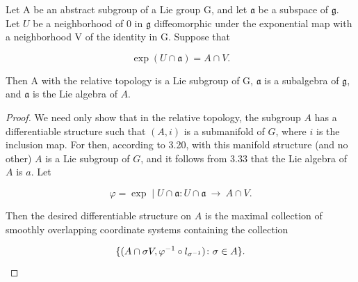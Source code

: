 \begin{theorem}\label{thm:3.34}
Let A be an abstract subgroup of a Lie group G, and let $\mathfrak{a}$ be a subspace of $\mathfrak{g}$. Let $U$ be a neighborhood of 0 in $\mathfrak{g}$ diffeomorphic under the exponential map with a neighborhood V of the identity in G. Suppose that

\begin{equation}
\tag{1}\label{eq:3.34:1}
\exp(U\cap\mathfrak{a})=A\cap V.
\end{equation}

Then A with the relative topology is a Lie subgroup of G, $\mathfrak{a}$ is a subalgebra of $\mathfrak{g}$, and $\mathfrak{a}$ is the Lie algebra of $A$.

\end{theorem}

\begin{proof}
We need only show that in the relative topology, the subgroup $A$ has a differentiable structure such that $(A,i)$ is a submanifold of $G$, where $i$ is the inclusion map. For then, according to 3.20, with this manifold structure (and no other) $A$ is a Lie subgroup of $G$, and it follows from 3.33 that the Lie algebra of $A$ is $a$. Let

\[
\varphi=\exp\mid U\cap\mathfrak{a}\colon U\cap\mathfrak{a}\ \to\ A\cap V.
\]

Then the desired differentiable structure on $A$ is the maximal collection of smoothly overlapping coordinate systems containing the collection

\[
\{(A\cap\sigma V,\varphi^{-1}\circ l_{\sigma^{-1}})\colon\sigma\in A\}.
\qedhere
\]
\end{proof}

